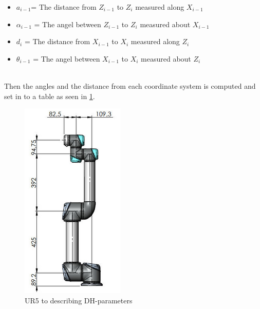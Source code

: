\begin{itemize}
    \item ${a_{i-1}}$= The distance from ${Z_{i-1}}$ to ${Z_{i}}$ measured along ${X_{i-1}}$
    \item ${\alpha_{i-1}}$ = The angel between ${Z_{i-1}}$ to ${Z_{i}}$ measured about ${X_{i-1}}$
    \item ${d_{i}}$ = The distance from ${X_{i-1}}$ to ${X_{i}}$ measured along ${Z_{i}}$
    \item ${\theta_{i-1}}$ = The angel between ${X_{i-1}}$ to ${X_{i}}$ measured about ${Z_{i}}$
\end{itemize}

\\
Then the angles and the distance from each coordinate system is computed and set in to a table as seen in \ref{fig:DH-Table}.

\begin{figure}[h!]
    \centering
    \includegraphics[scale=0.79]{Design/UR5measure.png}
    \caption{UR5 to describing DH-parameters \cite{DH}} 
    \label{fig:DH-Table} 
\end{figure}

